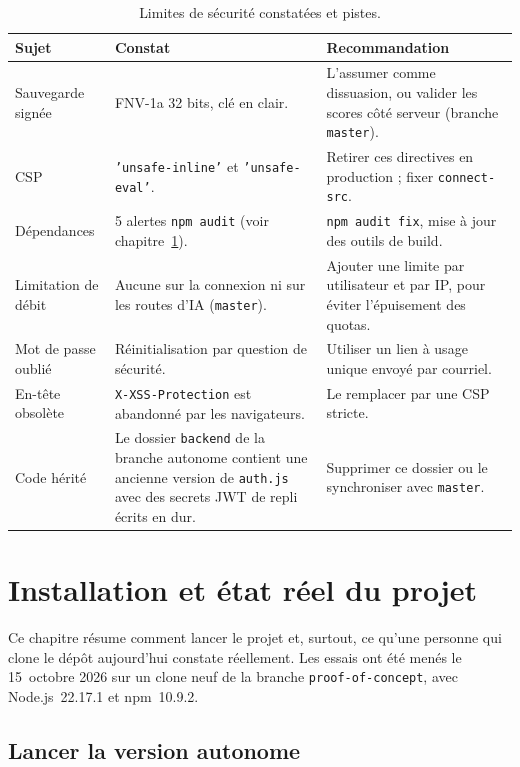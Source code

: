 \documentclass[11pt,a4paper]{report}
\newcommand{\code}[1]{\texttt{\nolinkurl{#1}}}
\newcommand{\file}[1]{\texttt{\nolinkurl{#1}}}
\begin{document}
\begin{table}[H]
\centering
\small
\begin{tabularx}{\textwidth}{@{}p{3.3cm}p{4.3cm}X@{}}
\toprule
\textbf{Sujet} & \textbf{Constat} & \textbf{Recommandation} \\
\midrule
Sauvegarde sign\'ee & FNV-1a 32 bits, cl\'e en clair. & L'assumer comme dissuasion, ou valider les scores c\^ot\'e serveur (branche \texttt{master}). \\
CSP & \texttt{'unsafe-inline'} et \texttt{'unsafe-eval'}. & Retirer ces directives en production ; fixer \texttt{connect-src}. \\
D\'ependances & 5 alertes \texttt{npm audit} (voir chapitre~\ref{chap:etat}). & \texttt{npm audit fix}, mise \`a jour des outils de build. \\
Limitation de d\'ebit & Aucune sur la connexion ni sur les routes d'IA (\texttt{master}). & Ajouter une limite par utilisateur et par IP, pour \'eviter l'\'epuisement des quotas. \\
Mot de passe oubli\'e & R\'einitialisation par question de s\'ecurit\'e. & Utiliser un lien \`a usage unique envoy\'e par courriel. \\
En-t\^ete obsol\`ete & \texttt{X-XSS-Protection} est abandonn\'e par les navigateurs. & Le remplacer par une CSP stricte. \\
Code h\'erit\'e & Le dossier \texttt{backend} de la branche autonome contient une ancienne version de \file{auth.js} avec des secrets JWT de repli \'ecrits en dur. & Supprimer ce dossier ou le synchroniser avec \texttt{master}. \\
\bottomrule
\end{tabularx}
\caption{Limites de s\'ecurit\'e constat\'ees et pistes.}
\end{table}

\chapter{Installation et \'etat r\'eel du projet}
\label{chap:etat}

Ce chapitre r\'esume comment lancer le projet et, surtout, ce qu'une personne qui clone
le d\'ep\^ot aujourd'hui constate r\'eellement. Les essais ont \'et\'e men\'es le 15~octobre
2026 sur un clone neuf de la branche \code{proof-of-concept}, avec Node.js~22.17.1 et
npm~10.9.2.

\section{Lancer la version autonome}
\end{document}
